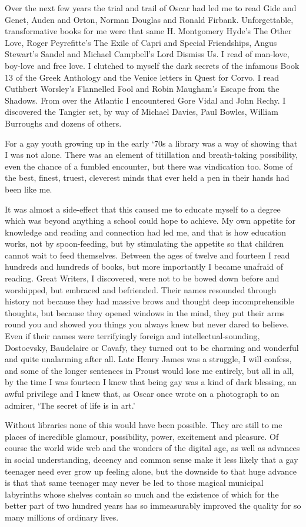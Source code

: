 \documentclass[10pt,a4paper]{article}
\begin{document}
Over the next few years the trial and trail of Oscar had led me to read Gide and Genet, Auden and Orton, Norman Douglas and Ronald Firbank. Unforgettable, transformative books for me were that same H. Montgomery Hyde’s The Other Love, Roger Peyrefitte’s The Exile of Capri and Special Friendships, Angus Stewart’s Sandel and Michael Campbell’s Lord Dismiss Us. I read of man-love, boy-love and free love. I clutched to myself the dark secrets of the infamous Book 13 of the Greek Anthology and the Venice letters in Quest for Corvo. I read Cuthbert Worsley’s Flannelled Fool and Robin Maugham’s Escape from the Shadows. From over the Atlantic I encountered Gore Vidal and John Rechy. I discovered the Tangier set, by way of Michael Davies, Paul Bowles, William Burroughs and dozens of others.

For a gay youth growing up in the early ‘70s a library was a way of showing that I was not alone. There was an element of titillation and breath-taking possibility, even the chance of a fumbled encounter, but there was vindication too. Some of the best, finest, truest, cleverest minds that ever held a pen in their hands had been like me.

It was almost a side-effect that this caused me to educate myself to a degree which was beyond anything a school could hope to achieve. My own appetite for knowledge and reading and connection had led me, and that is how education works, not by spoon-feeding, but by stimulating the appetite so that children cannot wait to feed themselves. Between the ages of twelve and fourteen I read hundreds and hundreds of books, but more importantly I became unafraid of reading. Great Writers, I discovered, were not to be bowed down before and worshipped, but embraced and befriended. Their names resounded through history not because they had massive brows and thought deep incomprehensible thoughts, but because they opened windows in the mind, they put their arms round you and showed you things you always knew but never dared to believe. Even if their names were terrifyingly foreign and intellectual-sounding, Dostoevsky, Baudelaire or Cavafy, they turned out to be charming and wonderful and quite unalarming after all. Late Henry James was a struggle, I will confess, and some of the longer sentences in Proust would lose me entirely, but all in all, by the time I was fourteen I knew that being gay was a kind of dark blessing, an awful privilege and I knew that, as Oscar once wrote on a photograph to an admirer, ‘The secret of life is in art.’

Without libraries none of this would have been possible. They are still to me places of incredible glamour, possibility, power, excitement and pleasure. Of course the world wide web and the wonders of the digital age, as well as advances in social understanding, decency and common sense make it less likely that a gay teenager need ever grow up feeling alone, but the downside to that huge advance is that that same teenager may never be led to those magical municipal labyrinths whose shelves contain so much and the existence of which for the better part of two hundred years has so immeasurably improved the quality for so many millions of ordinary lives.
\end{document}
